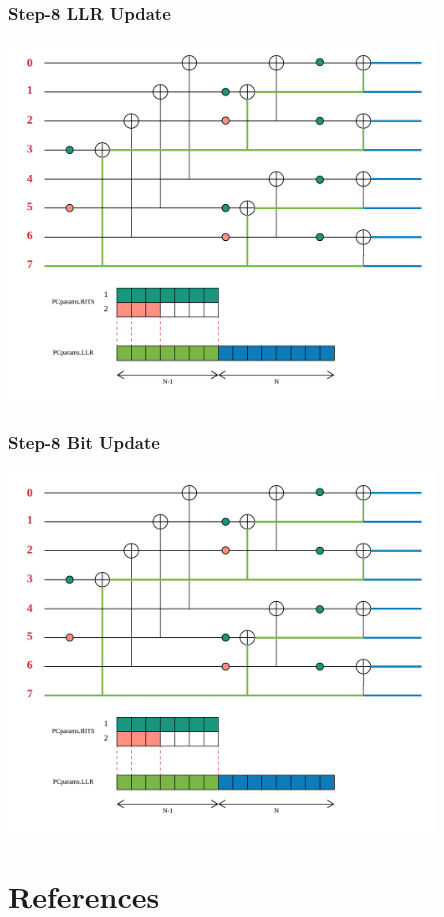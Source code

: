 \documentclass{beamer}
\begin{document}
\begin{frame}
\frametitle{Step-8 LLR Update}
  \begin{center}
  \includegraphics[width=0.85\textwidth]{pics/polar_-_SC_llr_8.png}
  \end{center}
\end{frame}

\begin{frame}
\frametitle{Step-8 Bit Update}
  \begin{center}
  \includegraphics[width=0.85\textwidth]{pics/polar_-_SC_bit_8.png}
  \end{center}
\end{frame}

\section{References}
\end{document}
